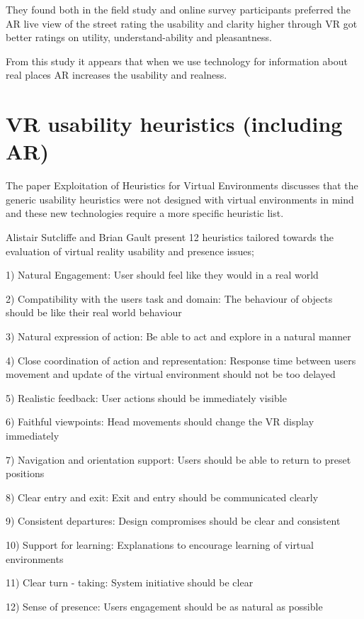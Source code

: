 \documentclass{scrartcl}
\begin{document}
They found both in the field study and online survey participants preferred the AR live view of the street rating the usability and clarity higher through VR got better ratings on utility, understand-ability and pleasantness.

From this study it appears that when we use technology for information about real places AR increases the usability and realness.

\section*{VR usability heuristics (including AR)}

The paper Exploitation of Heuristics for Virtual Environments\cite{hvannberg2012exploitation} discusses that the generic usability heuristics were not designed with virtual environments in mind and these new technologies require a more specific heuristic list.

Alistair Sutcliffe and Brian Gault present 12 heuristics\cite{sutcliffe2000heuristic} tailored towards the evaluation of virtual reality usability and presence issues;

1) Natural Engagement: User should feel like they would in a real world

2) Compatibility with the users task and domain: The behaviour of objects should be like their real world behaviour

3) Natural expression of action: Be able to act and explore in a natural manner

4) Close coordination of action and representation: Response time between users movement and update of the virtual environment should not be too delayed

5) Realistic feedback: User actions should be immediately visible

6) Faithful viewpoints: Head movements should change the VR display immediately

7) Navigation and orientation support: Users should be able to return to preset positions

8) Clear entry and exit: Exit and entry should be communicated clearly

9) Consistent departures: Design compromises should be clear and consistent

10) Support for learning: Explanations to encourage learning of virtual environments

11) Clear turn - taking: System initiative should be clear

12) Sense of presence: Users engagement should be as natural as possible
\end{document}
